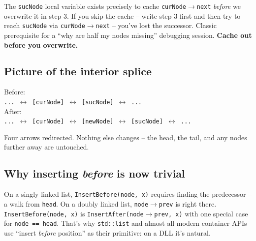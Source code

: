 \documentclass[11pt]{article}
\begin{document}
\begin{warnbox}
The \texttt{sucNode} local variable exists precisely to cache
\texttt{curNode$\to$next} \emph{before} we overwrite it in step 3.
If you skip the cache -- write step 3 first and then try to reach
\texttt{sucNode} via \texttt{curNode$\to$next} -- you've lost the
successor. Classic prerequisite for a ``why are half my nodes
missing'' debugging session. \textbf{Cache out before you
overwrite.}
\end{warnbox}

\subsection{Picture of the interior splice}

\begin{center}
\footnotesize
Before:\\
\texttt{... $\leftrightarrow$ [curNode] $\leftrightarrow$ [sucNode] $\leftrightarrow$ ...}
\\[0.5em]
After:\\
\texttt{... $\leftrightarrow$ [curNode] $\leftrightarrow$ [newNode] $\leftrightarrow$ [sucNode] $\leftrightarrow$ ...}
\end{center}

Four arrows redirected. Nothing else changes -- the head, the tail,
and any nodes further away are untouched.

\subsection{Why inserting \emph{before} is now trivial}

\begin{ideabox}
On a singly linked list, \texttt{InsertBefore(node, x)} requires
finding the predecessor -- a walk from \texttt{head}. On a doubly
linked list, \texttt{node$\to$prev} is right there.
\texttt{InsertBefore(node, x)} is \texttt{InsertAfter(node$\to$prev, x)}
with one special case for \texttt{node == head}. That's why
\texttt{std::list} and almost all modern container APIs use
``insert \emph{before} position'' as their primitive: on a DLL
it's natural.
\end{ideabox}
\end{document}
